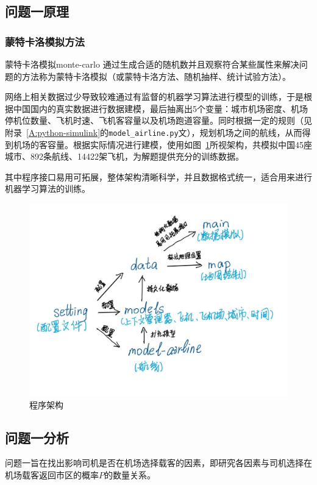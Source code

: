 \subsection{问题一原理}
\subsubsection{蒙特卡洛模拟方法}
\begin{defnbox}{蒙特卡洛模拟\cite{Weisstein2019monte}}{monte-carlo}
    通过生成合适的随机数并且观察符合某些属性来解决问题的方法称为蒙特卡洛模拟（或蒙特卡洛方法、随机抽样、统计试验方法）。
\end{defnbox}

网络上相关数据过少导致较难通过有监督的机器学习算法进行模型的训练，于是根据中国国内的真实数据进行数据建模，最后抽离出5个变量：城市机场密度、机场停机位数量、飞机时速、飞机客容量以及机场跑道容量。同时根据一定的规则（见附录~\ref{A:python-simulink}的\texttt{model\_airline.py}文），规划机场之间的航线，从而得到机场的客容量。根据实际情况进行建模，使用如图~\ref{fig:architecture}所视架构，共模拟中国45座城市、892条航线、14422架飞机，为解题提供充分的训练数据。

其中程序接口易用可拓展，整体架构清晰科学，并且数据格式统一，适合用来进行机器学习算法的训练。

\begin{figure}
    \centering
    \includegraphics[width=.8\textwidth]{figures/程序架构.jpeg}
    \caption{程序架构}\label{fig:architecture}
\end{figure}


\subsection{问题一分析}
问题一旨在找出影响司机是否在机场选择载客的因素，即研究各因素与司机选择在机场载客返回市区的概率$P$的数量关系。

